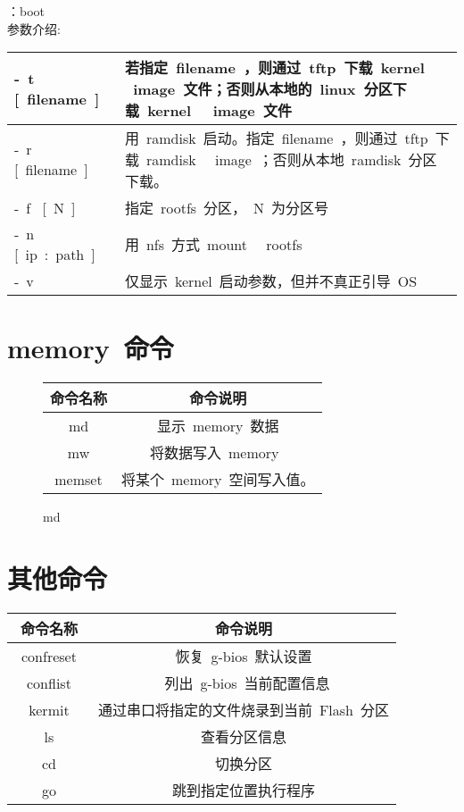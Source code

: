 ：boot\\
参数介绍:\\
\begin{table}[htbp]
\setlength{\parindent}{0pt}
\begin{tabular}{|p{2.5cm}|p{8.5cm}|}
\hline
-~t~ [~filename~] &若指定~filename~，则通过~tftp~下载~kernel~ ~image~文件；否则从本地的~linux~分区下载~kernel~ ~image~文件 \\ \hline
-~r~ [~filename~] &用~ramdisk~启动。指定~filename~，则通过~tftp~下载~ramdisk~ ~image~；否则从本地~ramdisk~分区下载。 \\ \hline
-~f~ [~N~] & 指定~rootfs~分区，~N~为分区号 \\ \hline
-~n~ [~ip~:~path~] & 用~nfs~方式~mount~ ~rootfs~ \\ \hline
-~v~ &仅显示~kernel~启动参数，但并不真正引导~OS~ \\ \hline
\end{tabular}
\end{table}
\pagebreak[4]

\section{memory~命令}
\begin{figure}[H]
\centering
\begin{tabular}{|c|c|}
\hline
命令名称 & 命令说明\\ \hline
md & 显示~memory~数据 \\ \hline
mw & 将数据写入~memory~ \\ \hline
memset & 将某个~memory~空间写入值。\\ \hline
\end{tabular}
\caption{md}
\end{figure}

\section{其他命令}
\begin{table}[htbp]
\setlength{\parindent}{0pt}
\begin{tabular}{|c|c|}
\hline
命令名称 & 命令说明\\
\hline
~confreset~ & 恢复~g-bios~默认设置\\ \hline
~conflist~ & ~列出~g-bios~当前配置信息\\ \hline
~kermit~ &通过串口将指定的文件烧录到当前~Flash~分区 \\ \hline
~ls~ & 查看分区信息\\ \hline
~cd~ & 切换分区\\ \hline
~go~ & 跳到指定位置执行程序\\ \hline
\end{tabular}
\end{table}

